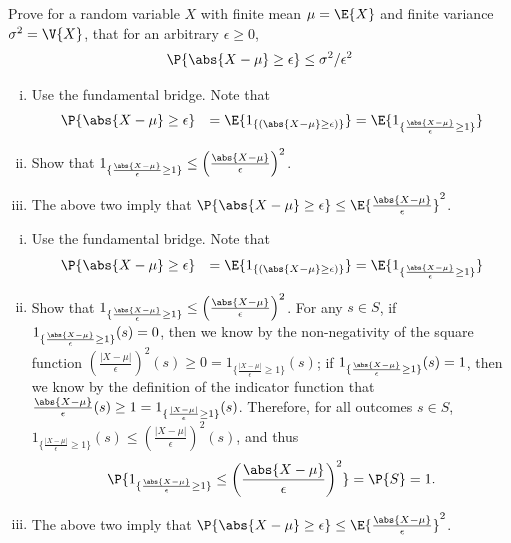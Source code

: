 	\begin{exercise}\label{ex:chap06:05 1}
	Prove for a random variable $X$ with finite mean $\mu=\E{X}$ and finite variance $\sigma^2=\V{X}$, that for an arbitrary $\epsilon \geq 0$,
	\begin{align*}
		\P{\abs{X-\mu}\geq \epsilon} \leq \sigma^2  /\epsilon^2
	\end{align*} 
	\begin{hint}
		\begin{enumerate}[i.]
			\item Use the fundamental bridge. Note that 
			\begin{equation*}
				\begin{array}{cl}
						\P{\abs{X-\mu}\geq \epsilon} &= \E{1_{\{\left( \abs{X-\mu}\geq \epsilon\right) \}}}= \E{1_{\{  \frac{\abs{X-\mu}}{\epsilon}\geq 1  \}}}
				\end{array}
			\end{equation*}
		\item Show that $1_{\{ \frac{\abs{X-\mu}}{\epsilon}\geq 1  \}}\leq \left( \frac{\abs{X-\mu}}{\epsilon}\right)^2 $.
		\item The above two imply that $\P{\abs{X-\mu}\geq \epsilon}\leq \E{ \frac{\abs{X-\mu}}{\epsilon}}^2$.
		\end{enumerate}
	\end{hint}
	\begin{solution}
			\begin{enumerate}[i.]
			\item Use the fundamental bridge. Note that 
			\begin{equation*}
				\begin{array}{cl}
					\P{\abs{X-\mu}\geq \epsilon} &= \E{1_{\{\left( \abs{X-\mu}\geq \epsilon\right)\}}}= \E{1_{\{  \frac{\abs{X-\mu}}{\epsilon}\geq 1  \}}}
				\end{array}
			\end{equation*}
			\item Show that $1_{\{ \frac{\abs{X-\mu}}{\epsilon}\geq 1  \}}\leq \left( \frac{\abs{X-\mu}}{\epsilon}\right)^2 $. For any $s\in S$, if $1_{\{ \frac{\abs{X-\mu}}{\epsilon}\geq 1  \}}(s)=0$, then we know by the non-negativity of the square function $\left( \frac{|X-\mu|}{\epsilon}\right)^2(s)\geq 0=1_{\{ \frac{|X-\mu|}{\epsilon}\geq 1  \}}(s)$;  if $1_{\{ \frac{\abs{X-\mu}}{\epsilon}\geq 1  \}}(s)=1$, then we know by the definition of the indicator function that $\frac{\abs{X-\mu}}{\epsilon}(s)\geq 1 =1_{\{ \frac{|X-\mu|}{\epsilon}\geq 1  \}}(s)$. Therefore, for all outcomes $s\in S$, $1_{\{ \frac{|X-\mu|}{\epsilon}\geq 1  \}}(s)\leq \left( \frac{|X-\mu|}{\epsilon}\right)^2(s)$, and thus $$\P{1_{\{ \frac{\abs{X-\mu}}{\epsilon}\geq 1  \}}\leq \left( \frac{\abs{X-\mu}}{\epsilon}\right)^2}=\P{S}=1. $$
			\item The above two imply that $\P{\abs{X-\mu}\geq \epsilon}\leq \E{\frac{\abs{X-\mu}}{\epsilon}}^2$.
		\end{enumerate}
	\end{solution}
\end{exercise}


